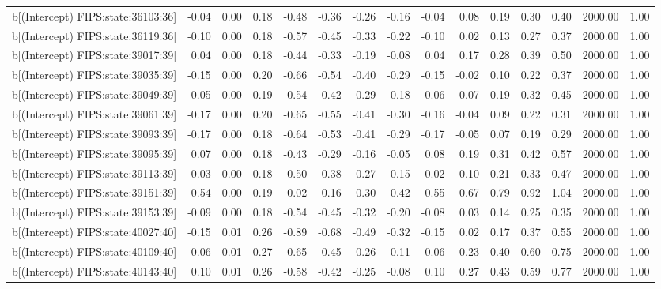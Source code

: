 \begin{table}[ht]
\begin{tabular}{rrrrrrrrrrrrrrr}
  b[(Intercept) FIPS:state:36103:36] & -0.04 & 0.00 & 0.18 & -0.48 & -0.36 & -0.26 & -0.16 & -0.04 & 0.08 & 0.19 & 0.30 & 0.40 & 2000.00 & 1.00 \\ 
  b[(Intercept) FIPS:state:36119:36] & -0.10 & 0.00 & 0.18 & -0.57 & -0.45 & -0.33 & -0.22 & -0.10 & 0.02 & 0.13 & 0.27 & 0.37 & 2000.00 & 1.00 \\ 
  b[(Intercept) FIPS:state:39017:39] & 0.04 & 0.00 & 0.18 & -0.44 & -0.33 & -0.19 & -0.08 & 0.04 & 0.17 & 0.28 & 0.39 & 0.50 & 2000.00 & 1.00 \\ 
  b[(Intercept) FIPS:state:39035:39] & -0.15 & 0.00 & 0.20 & -0.66 & -0.54 & -0.40 & -0.29 & -0.15 & -0.02 & 0.10 & 0.22 & 0.37 & 2000.00 & 1.00 \\ 
  b[(Intercept) FIPS:state:39049:39] & -0.05 & 0.00 & 0.19 & -0.54 & -0.42 & -0.29 & -0.18 & -0.06 & 0.07 & 0.19 & 0.32 & 0.45 & 2000.00 & 1.00 \\ 
  b[(Intercept) FIPS:state:39061:39] & -0.17 & 0.00 & 0.20 & -0.65 & -0.55 & -0.41 & -0.30 & -0.16 & -0.04 & 0.09 & 0.22 & 0.31 & 2000.00 & 1.00 \\ 
  b[(Intercept) FIPS:state:39093:39] & -0.17 & 0.00 & 0.18 & -0.64 & -0.53 & -0.41 & -0.29 & -0.17 & -0.05 & 0.07 & 0.19 & 0.29 & 2000.00 & 1.00 \\ 
  b[(Intercept) FIPS:state:39095:39] & 0.07 & 0.00 & 0.18 & -0.43 & -0.29 & -0.16 & -0.05 & 0.08 & 0.19 & 0.31 & 0.42 & 0.57 & 2000.00 & 1.00 \\ 
  b[(Intercept) FIPS:state:39113:39] & -0.03 & 0.00 & 0.18 & -0.50 & -0.38 & -0.27 & -0.15 & -0.02 & 0.10 & 0.21 & 0.33 & 0.47 & 2000.00 & 1.00 \\ 
  b[(Intercept) FIPS:state:39151:39] & 0.54 & 0.00 & 0.19 & 0.02 & 0.16 & 0.30 & 0.42 & 0.55 & 0.67 & 0.79 & 0.92 & 1.04 & 2000.00 & 1.00 \\ 
  b[(Intercept) FIPS:state:39153:39] & -0.09 & 0.00 & 0.18 & -0.54 & -0.45 & -0.32 & -0.20 & -0.08 & 0.03 & 0.14 & 0.25 & 0.35 & 2000.00 & 1.00 \\ 
  b[(Intercept) FIPS:state:40027:40] & -0.15 & 0.01 & 0.26 & -0.89 & -0.68 & -0.49 & -0.32 & -0.15 & 0.02 & 0.17 & 0.37 & 0.55 & 2000.00 & 1.00 \\ 
  b[(Intercept) FIPS:state:40109:40] & 0.06 & 0.01 & 0.27 & -0.65 & -0.45 & -0.26 & -0.11 & 0.06 & 0.23 & 0.40 & 0.60 & 0.75 & 2000.00 & 1.00 \\ 
  b[(Intercept) FIPS:state:40143:40] & 0.10 & 0.01 & 0.26 & -0.58 & -0.42 & -0.25 & -0.08 & 0.10 & 0.27 & 0.43 & 0.59 & 0.77 & 2000.00 & 1.00 \\ 

\end{tabular}
\end{table}
